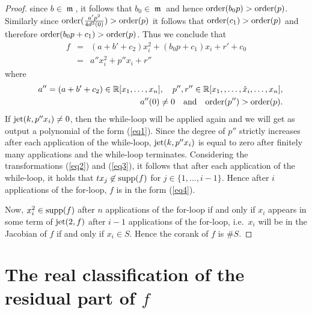 \documentclass{amsproc}
\DeclareMathOperator{\m}{\mathfrak{m}}
\begin{document}
\begin{proof}
since $b\in\m$, it follows that $b_0\in\m$ and hence
$\textnormal{order}(b_0p)>\textnormal{order}(p)$. Similarly since
$\textnormal{order}(\frac{a'p^2}{4d^2(0)})>\textnormal{order}(p)$ it
follows that $\textnormal{order}(c_1)>\textnormal{order}(p)$ and therefore
$\textnormal{order}(b_0p+c_1)>\textnormal{order}(p)$. Thus we conclude that
\begin{eqnarray}
f&=&(a+b'+c_2)x_i^2+(b_0p+c_1)x_i+r'+c_0\nonumber\\
&=&a''x_i^2+p''x_i+r''\label{eq1}
\end{eqnarray}
where
\begin{eqnarray*}
&&a'' = (a+b'+c_2)\in\mathbb R[x_1,\ldots,x_n],\quad
p'',r''\in\mathbb R[x_1,,\ldots,\hat x_i,\ldots,x_n],\\
&&a''(0)\neq0\quad\textnormal{and}\quad\textnormal{order}(p'')>\textnormal{order}(p).
\end{eqnarray*}
If $\textnormal{jet}(k,p''x_i)\neq 0$, then the while-loop will be applied
again
and we will get as output a polynomial of the form (\ref{eq1}). Since
the degree
of $p''$ strictly increases after each application of the while-loop,
$\textnormal{jet}(k,p''x_i)$ is equal to zero after finitely many applications
and the while-loop terminates. Considering the transformations  (\ref{eq2})
and
(\ref{eq3}), it follows that after each application of the while-loop,
it holds
that $tx_j\not\in\textnormal{supp}(f)$ for $j\in\{1,\ldots,i-1\}$. Hence
after $i$ applications of the for-loop, $f$ is in the form (\ref{eq4}).

Now, $x_i^2\in\textnormal{supp}(f)$ after $n$ applications of the for-loop
if and only if $x_i$ appears in some term of $\textnormal{jet}(2,f)$ after
$i-1$ applications of the for-loop, i.e.~$x_i$ will be in the Jacobian of
$f$ if and only if $x_i\in S$. Hence the corank of $f$ is $\#S$.
\end{proof}

\section{The real classification of the residual part of $f$}\label{TheRealClassificationOfTheResidualPart}
\end{document}
